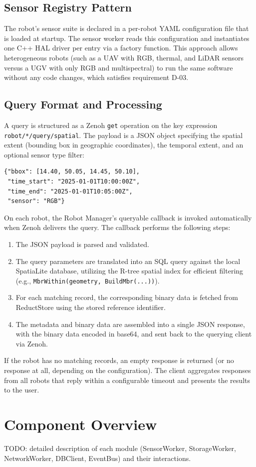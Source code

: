 \subsection{Sensor Registry Pattern} \label{subsec:sensor-registry}

The robot's sensor suite is declared in a per-robot YAML configuration file that is loaded at startup. The sensor worker reads this configuration and instantiates one C++ HAL driver per entry via a factory function. This approach allows heterogeneous robots (such as a UAV with RGB, thermal, and LiDAR sensors versus a UGV with only RGB and multispectral) to run the same software without any code changes, which satisfies requirement D-03.


\subsection{Query Format and Processing} \label{subsec:query-format}

A query is structured as a Zenoh \texttt{get} operation on the key expression \texttt{robot/*/query/spatial}. The payload is a JSON object specifying the spatial extent (bounding box in geographic coordinates), the temporal extent, and an optional sensor type filter:

\begin{verbatim}
{"bbox": [14.40, 50.05, 14.45, 50.10],
 "time_start": "2025-01-01T10:00:00Z",
 "time_end": "2025-01-01T10:05:00Z",
 "sensor": "RGB"}
\end{verbatim}

On each robot, the Robot Manager's queryable callback is invoked automatically when Zenoh delivers the query. The callback performs the following steps:
\begin{enumerate}
    \item The JSON payload is parsed and validated.
    \item The query parameters are translated into an SQL query against the local SpatiaLite database, utilizing the R-tree spatial index for efficient filtering (e.g., \texttt{MbrWithin(geometry, BuildMbr(...))}).
    \item For each matching record, the corresponding binary data is fetched from ReductStore using the stored reference identifier.
    \item The metadata and binary data are assembled into a single JSON response, with the binary data encoded in base64, and sent back to the querying client via Zenoh.
\end{enumerate}

If the robot has no matching records, an empty response is returned (or no response at all, depending on the configuration). The client aggregates responses from all robots that reply within a configurable timeout and presents the results to the user.


\section{Component Overview} \label{sec:component-overview}

TODO: detailed description of each module (SensorWorker, StorageWorker, NetworkWorker, DBClient, EventBus) and their interactions.

